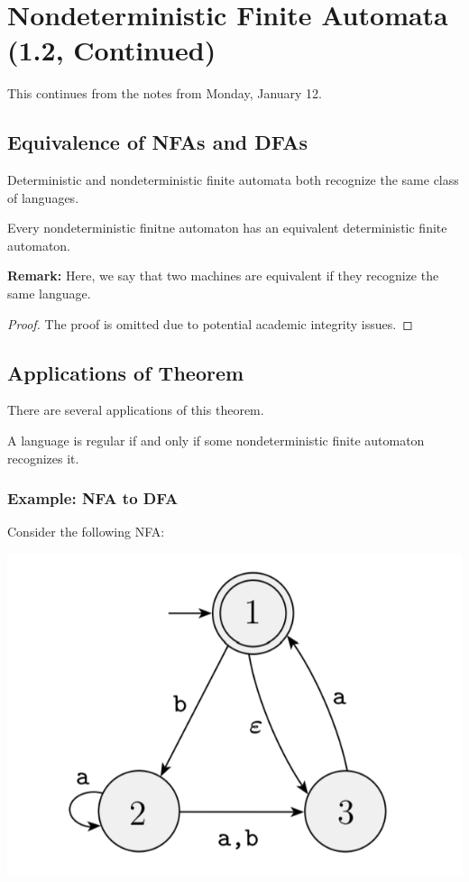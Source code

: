 \documentclass[letterpaper]{article}
\begin{document}
\section{Nondeterministic Finite Automata (1.2, Continued)}
This continues from the notes from Monday, January 12.

\subsection{Equivalence of NFAs and DFAs}
Deterministic and nondeterministic finite automata both recognize the same class of languages.

\begin{theorem}{}{}
    Every nondeterministic finitne automaton has an equivalent deterministic finite automaton.
\end{theorem}
\textbf{Remark:} Here, we say that two machines are equivalent if they recognize the same language. 

\begin{mdframed}[]
    \begin{proof}
        The proof is omitted due to potential academic integrity issues.
    \end{proof}
\end{mdframed}

\subsection{Applications of Theorem}
There are several applications of this theorem. 

\begin{corollary}{}{}
    A language is regular if and only if some nondeterministic finite automaton recognizes it.
\end{corollary}

\subsubsection{Example: NFA to DFA}
Consider the following NFA:
\begin{center}
    \includegraphics[scale=0.5]{../assets/nfa_to_dfa_1.png}
\end{center}
\end{document}
